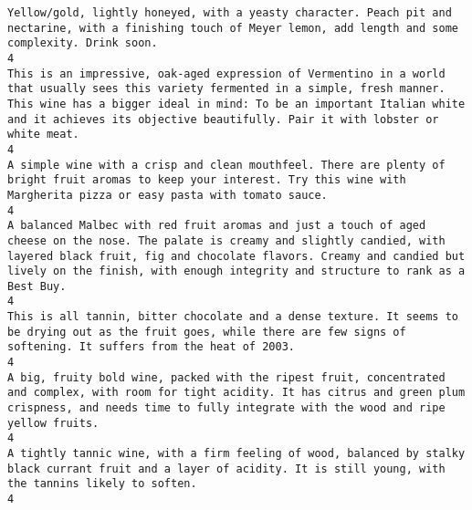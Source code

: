 \documentclass[11pt]{article}
\begin{document}
\begin{Verbatim}[commandchars=\\\{\}]
Yellow/gold, lightly honeyed, with a yeasty character. Peach pit and nectarine, with a finishing touch of Meyer lemon, add length and some complexity. Drink soon.                                                                                                                                                                                                                                             4
This is an impressive, oak-aged expression of Vermentino in a world that usually sees this variety fermented in a simple, fresh manner. This wine has a bigger ideal in mind: To be an important Italian white and it achieves its objective beautifully. Pair it with lobster or white meat.                                                                                                                  4
A simple wine with a crisp and clean mouthfeel. There are plenty of bright fruit aromas to keep your interest. Try this wine with Margherita pizza or easy pasta with tomato sauce.                                                                                                                                                                                                                            4
A balanced Malbec with red fruit aromas and just a touch of aged cheese on the nose. The palate is creamy and slightly candied, with layered black fruit, fig and chocolate flavors. Creamy and candied but lively on the finish, with enough integrity and structure to rank as a Best Buy.                                                                                                                   4
This is all tannin, bitter chocolate and a dense texture. It seems to be drying out as the fruit goes, while there are few signs of softening. It suffers from the heat of 2003.                                                                                                                                                                                                                               4
A big, fruity bold wine, packed with the ripest fruit, concentrated and complex, with room for tight acidity. It has citrus and green plum crispness, and needs time to fully integrate with the wood and ripe yellow fruits.                                                                                                                                                                                  4
A tightly tannic wine, with a firm feeling of wood, balanced by stalky black currant fruit and a layer of acidity. It is still young, with the tannins likely to soften.                                                                                                                                                                                                                                       4

\end{Verbatim}
\end{document}
